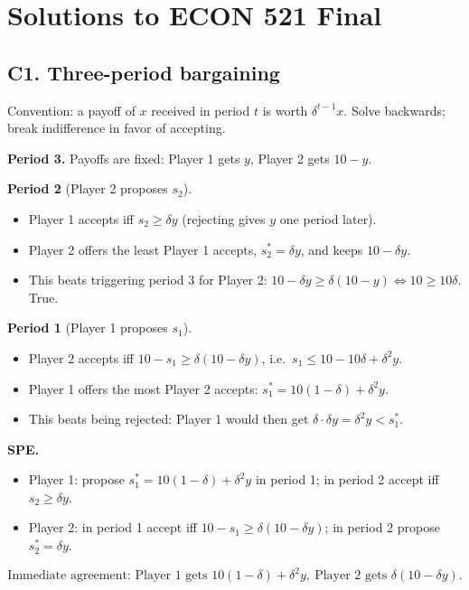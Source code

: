 \documentclass[11pt]{article}
\begin{document}
\section*{Solutions to ECON 521 Final}

\subsection*{C1. Three-period bargaining}
Convention: a payoff of $x$ received in period $t$ is worth $\delta^{t-1}x$. Solve backwards; break indifference in favor of accepting.

\textbf{Period 3.} Payoffs are fixed: Player 1 gets $y$, Player 2 gets $10-y$.

\textbf{Period 2} (Player 2 proposes $s_2$).
\begin{itemize}
  \item Player 1 accepts iff $s_2\ge\delta y$ (rejecting gives $y$ one period later).
  \item Player 2 offers the least Player 1 accepts, $s_2^*=\delta y$, and keeps $10-\delta y$.
  \item This beats triggering period 3 for Player 2: $10-\delta y\ge\delta(10-y)\iff 10\ge 10\delta$. True.
\end{itemize}

\textbf{Period 1} (Player 1 proposes $s_1$).
\begin{itemize}
  \item Player 2 accepts iff $10-s_1\ge\delta(10-\delta y)$, i.e.\ $s_1\le 10-10\delta+\delta^2y$.
  \item Player 1 offers the most Player 2 accepts: $s_1^*=10(1-\delta)+\delta^2 y$.
  \item This beats being rejected: Player 1 would then get $\delta\cdot\delta y=\delta^2y<s_1^*$.
\end{itemize}

\textbf{SPE.}
\begin{itemize}
  \item Player 1: propose $s_1^*=10(1-\delta)+\delta^2y$ in period 1; in period 2 accept iff $s_2\ge\delta y$.
  \item Player 2: in period 1 accept iff $10-s_1\ge\delta(10-\delta y)$; in period 2 propose $s_2^*=\delta y$.
\end{itemize}
\[
  \boxed{\text{Immediate agreement: Player 1 gets } 10(1-\delta)+\delta^2 y,\ \text{Player 2 gets } \delta(10-\delta y).}
\]
\end{document}

